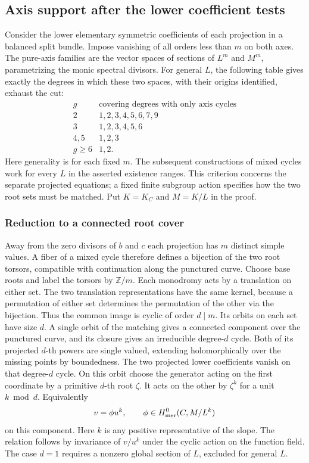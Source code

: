 \subsection{Axis support after the lower coefficient tests}\label{sec:matching}
Consider the lower elementary symmetric coefficients of each projection
in a balanced split bundle. Impose vanishing of all orders less than
$m$ on both axes. The pure-axis families are the vector spaces of
sections of $L^m$ and $M^m$, parametrizing the monic spectral divisors.
For general $L$, the following table gives exactly the degrees in
which these two spaces, with their origins identified, exhaust the cut:
\[
\begin{array}{c|l}
 g&\text{covering degrees with only axis cycles}\\ \hline
 2&1,2,3,4,5,6,7,9\\
 3&1,2,3,4,5,6\\
 4,5&1,2,3\\
 g\ge6&1,2 .
\end{array}
\]
Here generality is for each fixed $m$. The subsequent constructions
of mixed cycles work for every $L$ in the asserted existence ranges.
This criterion concerns the separate projected equations; a fixed
finite subgroup action specifies how the two root sets must be matched.
Put $K=K_C$ and $M=K/L$ in the proof.
\subsubsection{Reduction to a connected root cover}

Away from the zero divisors of $b$ and $c$ each projection has $m$ distinct simple values. A fiber of a mixed cycle therefore defines a bijection of the two root torsors, compatible with continuation along the punctured curve. Choose base roots and label the torsors by $\mathbb Z/m$. Each monodromy acts by a translation on either set. The two translation representations have the same kernel, because a permutation of either set determines the permutation of the other via the bijection. Thus the common image is cyclic of order $d\mid m$. Its orbits on each set have size $d$. A single orbit of the matching gives a connected component over the punctured curve, and its closure gives an irreducible degree-$d$ cycle. Both of its projected $d$-th powers are single valued, extending holomorphically over the missing points by boundedness. The two projected lower coefficients vanish on that degree-$d$ cycle. On this orbit choose the generator acting on the first coordinate by a primitive $d$-th root $\zeta$. It acts on the other by $\zeta^k$ for a unit $k\bmod d$. Equivalently
\[
 v=\phi u^k,\qquad \phi\in H^0_{\rm mer}(C,M/L^k)
\]
on this component. Here $k$ is any positive representative of the slope. The relation follows by invariance of $v/u^k$ under the cyclic action on the function field. The case $d=1$ requires a nonzero global section of $L$, excluded for general $L$.

